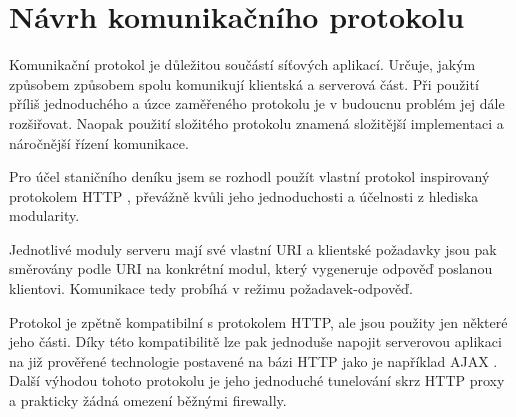 \newpage
\section{Návrh komunikačního protokolu}
\label{navrh_protokol}


Komunikační protokol je důležitou součástí síťových aplikací. Určuje, jakým způsobem způsobem spolu komunikují
klientská a serverová část. Při použití příliš jednoduchého a úzce zaměřeného protokolu je v budoucnu problém
jej dále rozšiřovat. Naopak použití složitého protokolu znamená složitější implementaci a náročnější řízení komunikace.

Pro účel staničního deníku jsem se rozhodl použít vlastní protokol inspirovaný protokolem HTTP \cite{http},
převážně kvůli jeho jednoduchosti a účelnosti z hlediska modularity.

Jednotlivé moduly serveru mají své vlastní URI a klientské požadavky jsou pak směrovány podle URI na konkrétní modul,
který vygeneruje odpověď poslanou klientovi. Komunikace tedy probíhá v režimu požadavek-odpověď.

Protokol je zpětně kompatibilní s protokolem HTTP, ale jsou použity jen některé jeho části. Díky této kompatibilitě
lze pak jednoduše napojit serverovou aplikaci na již prověřené technologie postavené na bázi HTTP jako je například
AJAX \cite{ajax}. Další výhodou tohoto protokolu je jeho jednoduché tunelování skrz HTTP proxy a prakticky žádná
omezení běžnými firewally.


